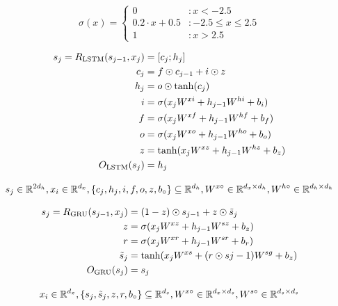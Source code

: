 \begin{equation} \label{eq:hardsigmoid}
  \sigma(x) = \begin{cases}
    0                 & : x < -2.5 \\
    0.2 \cdot x + 0.5 & : -2.5 \leq x \leq 2.5 \\
    1                 & : x > 2.5
  \end{cases}
\end{equation}

\begin{gather} \label{eq:lstm}
  \begin{split}
  s_j = R_{\text{LSTM}}(s_{j-1}, x_j) &= [c_j;h_j] \\
                           c_j &= f \odot c_{j-1} + i \odot z \\
                           h_j &= o \odot \tanh(c_j) \\
                             i &= \sigma(x_j W^{xi} + h_{j-1} W^{hi} + b_i) \\
                             f &= \sigma(x_j W^{xf} + h_{j-1} W^{hf} + b_f) \\
                             o &= \sigma(x_j W^{xo} + h_{j-1} W^{ho} + b_o) \\
                             z &= \tanh(x_j W^{xz} + h_{j-1} W^{hz} + b_z) \\
          O_{\text{LSTM}}(s_j) &= h_j
  \end{split}
  \\[2ex]
  s_j\in \mathbb{R}^{2d_h}, x_i\in \mathbb{R}^{d_x},
  \left\{c_j, h_j, i, f, o, z, b_{\circ}\right\}\subseteq \mathbb{R}^{d_h},
  W^{x\circ}\in \mathbb{R}^{d_x\times d_h},
  W^{h\circ}\in \mathbb{R}^{d_h\times d_h} \notag
\end{gather}

\begin{gather} \label{eq:gru}
  \begin{split}
  s_j = R_{\text{GRU}}(s_{j-1}, x_j) &= (1 - z) \odot s_{j-1} + z \odot {\tilde s}_j \\
                            z &= \sigma(x_j W^{xz} + h_{j-1} W^{sz} + b_z) \\
                            r &= \sigma(x_j W^{xr} + h_{j-1} W^{sr} + b_r) \\
                 {\tilde s}_j &= \tanh(x_j W^{xs} + (r \odot s{j-1}) W^{sg} + b_z) \\
          O_{\text{GRU}}(s_j) &= s_j
  \end{split}
  \\[2ex]
  x_i\in \mathbb{R}^{d_x},
  \left\{s_j, {\tilde s}_j, z, r, b_{\circ}\right\} \subseteq \mathbb{R}^{d_s},
  W^{x\circ}\in \mathbb{R}^{d_x\times d_s},
  W^{s\circ}\in \mathbb{R}^{d_s\times d_s} \notag
\end{gather}


